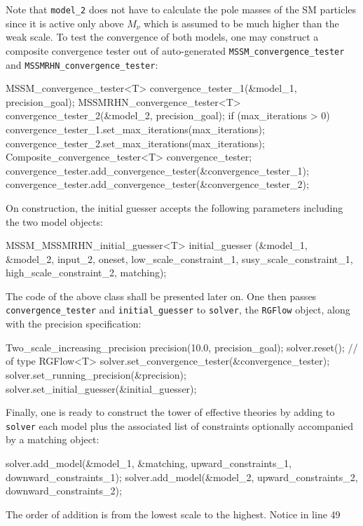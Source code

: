 \documentclass[final,3p,11pt,pdflatex]{elsarticle}
\newcommand{\code}[1]{\lstinline|#1|}  %
\begin{document}
Note that \code{model_2} does not have to calculate the pole masses of
the SM particles since it is active only above $M_\nu$
which is assumed to be much higher than the weak scale.
To test the convergence of both models,
one may construct a composite convergence tester
out of auto-generated
\code{MSSM_convergence_tester} and \code{MSSMRHN_convergence_tester}:
\begin{numlstlisting}[name=SGrun]
  MSSM_convergence_tester<T> convergence_tester_1(&model_1, precision_goal);
  MSSMRHN_convergence_tester<T> convergence_tester_2(&model_2, precision_goal);
  if (max_iterations > 0) {
    convergence_tester_1.set_max_iterations(max_iterations);
    convergence_tester_2.set_max_iterations(max_iterations);
  }
  Composite_convergence_tester<T> convergence_tester;
  convergence_tester.add_convergence_tester(&convergence_tester_1);
  convergence_tester.add_convergence_tester(&convergence_tester_2);
\end{numlstlisting}
On construction,
the initial guesser accepts the following parameters
including the two model objects:
\begin{numlstlisting}[name=SGrun]
  MSSM_MSSMRHN_initial_guesser<T> initial_guesser
    (&model_1, &model_2, input_2, oneset,
     low_scale_constraint_1, susy_scale_constraint_1, high_scale_constraint_2,
     matching);
\end{numlstlisting}
The code of the above class shall be presented later on.
One then passes
\code{convergence_tester} and \code{initial_guesser}
to \code{solver}, the \code{RGFlow} object,
along with the precision specification:
\begin{numlstlisting}[name=SGrun]
  Two_scale_increasing_precision precision(10.0, precision_goal);
  solver.reset();                  // of type RGFlow<T>
  solver.set_convergence_tester(&convergence_tester);
  solver.set_running_precision(&precision);
  solver.set_initial_guesser(&initial_guesser);
\end{numlstlisting}
Finally,
one is ready to construct the tower of effective theories
by adding to \code{solver}
each model plus the associated list of constraints
optionally accompanied by a matching object:
\begin{numlstlisting}[name=SGrun]
  solver.add_model(&model_1, &matching, upward_constraints_1, downward_constraints_1);
  solver.add_model(&model_2, upward_constraints_2, downward_constraints_2);
\end{numlstlisting}
The order of addition is from the lowest scale to the highest.
Notice in line 49
\end{document}
